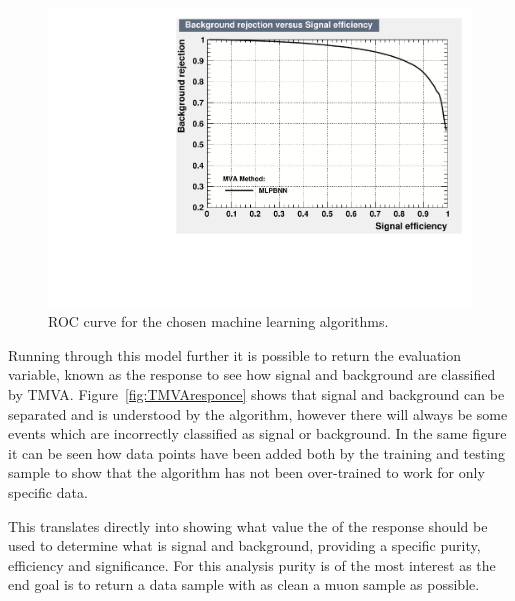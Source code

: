 \begin{figure}[h!]
\centering

\includegraphics[width=\textwidth]{figures/TMVA/ROC1.pdf}
\caption{ROC curve for the chosen machine learning algorithms.}
\label{fig:TMVAroc2}
\end{figure}

Running through this model further it is possible to return the evaluation variable, known as the response to see how signal and background are classified by TMVA. Figure~\ref{fig:TMVAresponce} shows that signal and background can be separated and is understood by the algorithm, however there will always be some events which are incorrectly classified as signal or background. In the same figure it can be seen how data points have been added both by the training and testing sample to show that the algorithm has not been over-trained to work for only specific data.

This translates directly into  showing what value the of the response should be used to determine what is signal and background, providing a specific purity, efficiency and significance. For this analysis purity is of the most interest as the end goal is to return a data sample with as clean a muon sample as possible.

